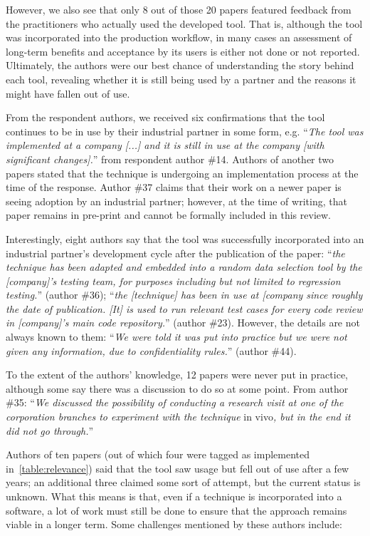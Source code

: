 However, we also see that only 8 out of those 20 papers featured feedback from the practitioners who actually used the developed tool.
That is, although the tool was incorporated into the production workflow, in many cases an assessment of long-term benefits and acceptance by its users is either not done or not reported.
%
Ultimately, the authors were our best chance of understanding the story behind each tool, revealing whether it is still being used by a partner and the reasons it might have fallen out of use.

From the respondent authors, we received six confirmations that the tool continues to be in use by their industrial partner in some form, e.g. ``\textit{The tool was implemented at a company [...] and it is still in use at the company [with significant changes].}'' from respondent author \#14.
Authors of another two papers stated that the technique is undergoing an implementation process at the time of the response.
Author \#37 claims that their work on a newer paper is seeing adoption by an industrial partner; however, at the time of writing, that paper remains in pre-print and cannot be formally included in this review.

Interestingly, eight authors say that the tool was successfully incorporated into an industrial partner's development cycle after the publication of the paper: ``\textit{the technique has been adapted and embedded into a random data selection tool by the [company]’s testing team, for purposes including but not limited to regression testing.}'' (author \#36); ``\textit{the [technique] has been in use at [company since roughly the date of publication. [It] is used to run relevant test cases for every code review in [company]'s main code repository.}'' (author \#23).
However, the details are not always known to them: ``\textit{We were told it was put into practice but we were not given any information, due to confidentiality rules.}'' (author \#44).

To the extent of the authors' knowledge, 12 papers were never put in practice, although some say there was a discussion to do so at some point.
From author \#35: ``\textit{We discussed the possibility of conducting a research visit at one of the corporation branches to experiment with the technique} in vivo\textit{, but in the end it did not go through.}''

Authors of ten papers (out of which four were tagged as implemented in~\autoref{table:relevance}) said that the tool saw usage but fell out of use after a few years; an additional three claimed some sort of attempt, but the current status is unknown.
What this means is that, even if a technique is incorporated into a software, a lot of work must still be done to ensure that the approach remains viable in a longer term.
Some challenges mentioned by these authors include:

